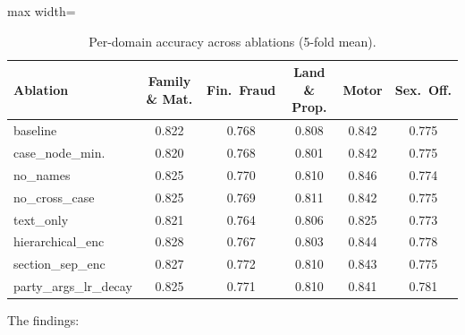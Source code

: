 \begin{table}[H]
  \centering
  \scriptsize
  \begin{adjustbox}{max width=\textwidth}
  \begin{tabular}{lccccc}
    \toprule
    Ablation & Family \& Mat. & Fin.\ Fraud & Land \& Prop. & Motor & Sex.\ Off. \\
    \midrule
    baseline          & 0.822 & 0.768 & 0.808 & 0.842 & 0.775 \\
    case\_node\_min.  & 0.820 & 0.768 & 0.801 & 0.842 & 0.775 \\
    no\_names         & 0.825 & 0.770 & 0.810 & 0.846 & 0.774 \\
    no\_cross\_case   & 0.825 & 0.769 & 0.811 & 0.842 & 0.775 \\
    text\_only        & 0.821 & 0.764 & 0.806 & 0.825 & 0.773 \\
    hierarchical\_enc & 0.828 & 0.767 & 0.803 & 0.844 & 0.778 \\
    section\_sep\_enc & 0.827 & 0.772 & 0.810 & 0.843 & 0.775 \\
    party\_args\_lr\_decay & 0.825 & 0.771 & 0.810 & 0.841 & 0.781 \\
    \bottomrule
  \end{tabular}
  \end{adjustbox}
  \caption{Per-domain accuracy across ablations (5-fold mean).}
  \label{tab:ablation_per_domain}
\end{table}

The findings:

